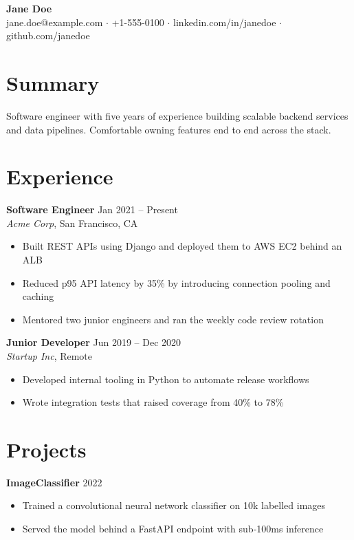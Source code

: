 \documentclass[11pt,a4paper]{article}
\begin{document}
\begin{center}
  {\Large \textbf{Jane Doe}} \\
  jane.doe@example.com $\cdot$ +1-555-0100 $\cdot$ linkedin.com/in/janedoe $\cdot$ github.com/janedoe
\end{center}

\section*{Summary}
Software engineer with five years of experience building scalable backend services
and data pipelines. Comfortable owning features end to end across the stack.

\section*{Experience}
\textbf{Software Engineer} \hfill Jan 2021 -- Present \\
\textit{Acme Corp}, San Francisco, CA
\begin{itemize}
  \item Built REST APIs using Django and deployed them to AWS EC2 behind an ALB
  \item Reduced p95 API latency by 35\% by introducing connection pooling and caching
  \item Mentored two junior engineers and ran the weekly code review rotation
\end{itemize}

\textbf{Junior Developer} \hfill Jun 2019 -- Dec 2020 \\
\textit{Startup Inc}, Remote
\begin{itemize}
  \item Developed internal tooling in Python to automate release workflows
  \item Wrote integration tests that raised coverage from 40\% to 78\%
\end{itemize}

\section*{Projects}
\textbf{ImageClassifier} \hfill 2022
\begin{itemize}
  \item Trained a convolutional neural network classifier on 10k labelled images
  \item Served the model behind a FastAPI endpoint with sub-100ms inference
\end{itemize}
\end{document}
